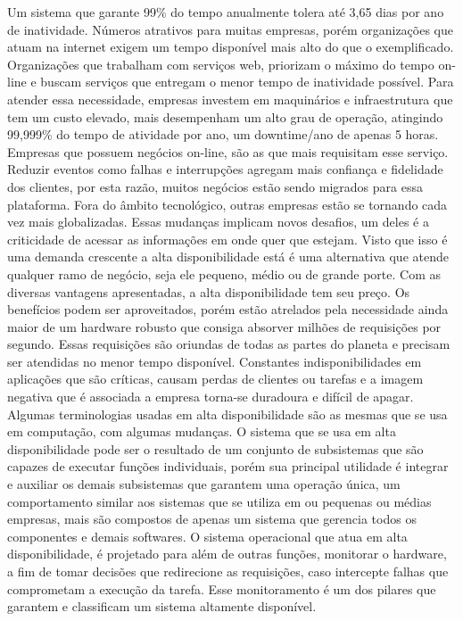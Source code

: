 Um sistema que garante 99\% do tempo anualmente tolera até 3,65 dias por ano de inatividade. Números atrativos para muitas empresas, porém organizações que atuam na internet exigem um tempo disponível mais alto do que o exemplificado. Organizações que trabalham com serviços web, priorizam o máximo do tempo on-line e buscam serviços que entregam o menor tempo de inatividade possível. Para atender essa necessidade, empresas investem em maquinários e infraestrutura que tem um custo elevado, mais desempenham um alto grau de operação, atingindo 99,999\% do tempo de atividade por ano, um downtime/ano de apenas 5 horas.
Empresas que possuem negócios on-line, são as que mais requisitam esse serviço. Reduzir eventos como falhas e interrupções agregam mais confiança e fidelidade dos clientes, por esta razão, muitos negócios estão sendo migrados para essa plataforma. Fora do âmbito tecnológico, outras empresas estão se tornando cada vez mais globalizadas. Essas mudanças implicam novos desafios, um deles é a criticidade de acessar as informações em onde quer que estejam. Visto que isso é uma demanda crescente a alta disponibilidade está é uma alternativa que atende qualquer ramo de negócio, seja ele pequeno, médio ou de grande porte.
Com as diversas vantagens apresentadas, a alta disponibilidade tem seu preço. Os benefícios podem ser aproveitados, porém estão atrelados pela necessidade ainda maior de um hardware robusto que consiga absorver milhões de requisições por segundo. Essas requisições são oriundas de todas as partes do planeta e precisam ser atendidas no menor tempo disponível. Constantes indisponibilidades em aplicações que são críticas, causam perdas de clientes ou tarefas e a imagem negativa que é associada a empresa torna-se duradoura e difícil de apagar.
Algumas terminologias usadas em alta disponibilidade são as mesmas que se usa em computação, com algumas mudanças. O sistema que se usa em alta disponibilidade pode ser o resultado de um conjunto de subsistemas que são capazes de executar funções individuais, porém sua principal utilidade é integrar e auxiliar os demais subsistemas que garantem uma operação única, um comportamento similar aos sistemas que se utiliza em ou pequenas ou médias empresas, mais são compostos de apenas um sistema que gerencia todos os componentes e demais softwares.
O sistema operacional que atua em alta disponibilidade, é projetado para além de outras funções, monitorar o hardware, a fim de tomar decisões que redirecione as requisições, caso intercepte falhas que comprometam a execução da tarefa. Esse monitoramento é um dos pilares que garantem e classificam um sistema altamente disponível.
